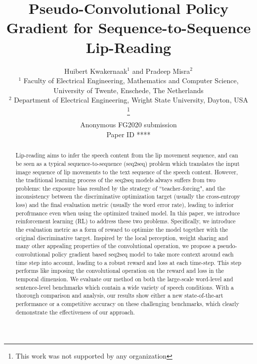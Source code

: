 \documentclass[a4paper, 10pt, conference]{ieeeconf}      %
\title{\LARGE \bf Pseudo-Convolutional Policy Gradient for Sequence-to-Sequence Lip-Reading
}
\author{\parbox{16cm}{\centering
    {\large Huibert Kwakernaak$^1$ and Pradeep Misra$^2$}\\
    {\normalsize
    $^1$ Faculty of Electrical Engineering, Mathematics and Computer Science, University of Twente, Enschede, The Netherlands\\
    $^2$ Department of Electrical Engineering, Wright State University, Dayton, USA}}
    \thanks{This work was not supported by any organization}%
}
\def\FGPaperID{****} %
\begin{document}
\ifFGfinal
\thispagestyle{empty}
\pagestyle{empty}
\else
\author{Anonymous FG2020 submission\\ Paper ID \FGPaperID \\}
\pagestyle{plain}
\fi
\maketitle



\begin{abstract}
	Lip-reading aims to infer the speech content from the lip movement sequence, and can be seen as a typical sequence-to-sequence (seq2seq) problem which translates the input image sequence of lip	movements to the text sequence of the speech content.
	However, the traditional learning process of the seq2seq models always suffers from two problems: the exposure bias resulted by the strategy of ``teacher-forcing", and the inconsistency between the discriminative optimization target (usually the cross-entropy loss) and the final evaluation metric (usually the word error rate), leading to inferior perofrmance even when using the optimized trained model. 
	In this paper, we introduce reinforcement learning (RL) to address these two problems. Specifically, we introduce the evaluation metric as a form of reward to optimize the model together with the original discriminative target. Inspired by the local perception, weight sharing and many other appealing properties of the convolutional operation, we propose a pseudo-convolutional policy gradient based seq2seq model to take more context around each time step into account, leading to a robust reward and loss at each time-step. This step performs like imposing the convolutional operation on the reward and loss in the temporal dimension. %
	We evaluate our method on both the large-scale word-level and sentence-level benchmarks which contain a wide variety of speech conditions. With a thorough comparison and analysis, our results show either a new state-of-the-art performance or a competitive accuracy on these challenging benchmarks, which clearly demonstrate the effectiveness of our approach.
\end{abstract}
\end{document}
